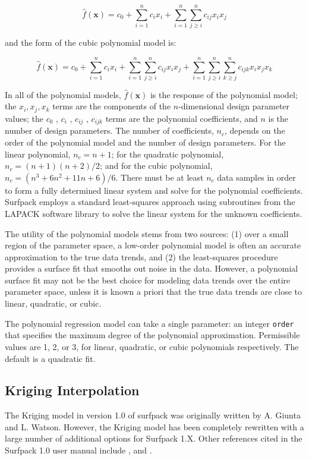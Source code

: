 \documentclass{article}
\begin{document}
\begin{equation}
  \hat{f}(\mathbf{x}) = c_{0}+\sum_{i=1}^{n}c_{i}x_{i}
  +\sum_{i=1}^{n}\sum_{j \ge i}^{n}c_{ij}x_{i}x_{j}
  \label{models:surf:equation02}
\end{equation}

and the form of the cubic polynomial model is:

\begin{equation}
  \hat{f}(\mathbf{x}) = c_{0}+\sum_{i=1}^{n}c_{i}x_{i}
  +\sum_{i=1}^{n}\sum_{j \ge i}^{n}c_{ij}x_{i}x_{j}
  +\sum_{i=1}^{n}\sum_{j \ge i}^{n}\sum_{k \ge j}^{n}
  c_{ijk}x_{i}x_{j}x_{k}
  \label{models:surf:equation03}
\end{equation}

In all of the polynomial models, $\hat{f}(\mathbf{x})$ is the response
of the polynomial model; the $x_{i},x_{j},x_{k}$ terms are the
components of the $n$-dimensional design parameter values; the $c_{0}$
, $c_{i}$ , $c_{ij}$ , $c_{ijk} $ terms are the polynomial
coefficients, and $n$ is the number of design parameters.  The number
of coefficients, $n_{c}$, depends on the order of the polynomial model and
the number of design parameters. For the linear polynomial, $n_c =n+1$;
for the quadratic polynomial, $n_c = (n+1)(n+2)/2$;
and for the cubic polynomial, $n_c = (n^{3}+6 n^{2}+11 n+6)/6$.
There must be at least $n_{c}$ data samples in order to form a fully
determined linear system and solve for the polynomial coefficients. 
Surfpack employs a standard least-squares approach using subroutines from the LAPACK software library to solve the linear system for the unknown coefficients.

The utility of the polynomial models stems from two sources: (1) over
a small region of the parameter space, a low-order polynomial model
is often an accurate approximation to the true data trends, and (2)
the least-squares procedure provides a surface fit that smooths out
noise in the data.  However, a polynomial surface fit may
not be the best choice for modeling data trends over the entire
parameter space, unless it is known a priori that the true data trends
are close to linear, quadratic, or cubic.

The polynomial regression model can take a single parameter: an integer \texttt{order} that specifies the maximum degree of the polynomial approximation.  Permissible values are 1, 2, or 3, for linear, quadratic, or cubic polynomials respectively.  The default is a quadratic fit.


\subsection{Kriging Interpolation }\label{models:surf:kriging}
The Kriging model in version 1.0 of surfpack was originally written by
A. Giunta and L. Watson\cite{giunta}.  However, the Kriging model has been
completely rewritten with a large number of additional options for Surfpack 
1.X.  Other references cited in the Surfpack 1.0 user manual include 
\cite{romero}, and \cite{koehler}.\newline
\end{document}

